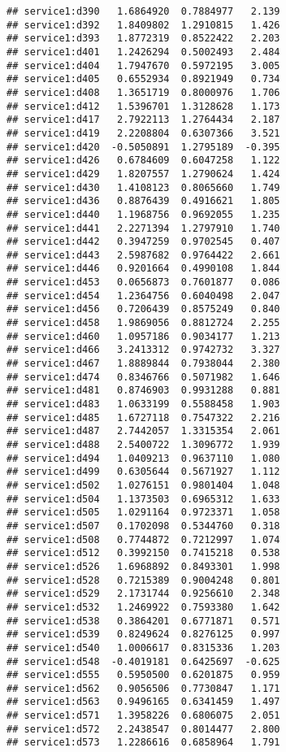 \documentclass[
]{article}
\begin{document}
\begin{verbatim}
## service1:d390   1.6864920  0.7884977   2.139
## service1:d392   1.8409802  1.2910815   1.426
## service1:d393   1.8772319  0.8522422   2.203
## service1:d401   1.2426294  0.5002493   2.484
## service1:d404   1.7947670  0.5972195   3.005
## service1:d405   0.6552934  0.8921949   0.734
## service1:d408   1.3651719  0.8000976   1.706
## service1:d412   1.5396701  1.3128628   1.173
## service1:d417   2.7922113  1.2764434   2.187
## service1:d419   2.2208804  0.6307366   3.521
## service1:d420  -0.5050891  1.2795189  -0.395
## service1:d426   0.6784609  0.6047258   1.122
## service1:d429   1.8207557  1.2790624   1.424
## service1:d430   1.4108123  0.8065660   1.749
## service1:d436   0.8876439  0.4916621   1.805
## service1:d440   1.1968756  0.9692055   1.235
## service1:d441   2.2271394  1.2797910   1.740
## service1:d442   0.3947259  0.9702545   0.407
## service1:d443   2.5987682  0.9764422   2.661
## service1:d446   0.9201664  0.4990108   1.844
## service1:d453   0.0656873  0.7601877   0.086
## service1:d454   1.2364756  0.6040498   2.047
## service1:d456   0.7206439  0.8575249   0.840
## service1:d458   1.9869056  0.8812724   2.255
## service1:d460   1.0957186  0.9034177   1.213
## service1:d466   3.2413312  0.9742732   3.327
## service1:d467   1.8889844  0.7938044   2.380
## service1:d474   0.8346766  0.5071982   1.646
## service1:d481   0.8746903  0.9931288   0.881
## service1:d483   1.0633199  0.5588458   1.903
## service1:d485   1.6727118  0.7547322   2.216
## service1:d487   2.7442057  1.3315354   2.061
## service1:d488   2.5400722  1.3096772   1.939
## service1:d494   1.0409213  0.9637110   1.080
## service1:d499   0.6305644  0.5671927   1.112
## service1:d502   1.0276151  0.9801404   1.048
## service1:d504   1.1373503  0.6965312   1.633
## service1:d505   1.0291164  0.9723371   1.058
## service1:d507   0.1702098  0.5344760   0.318
## service1:d508   0.7744872  0.7212997   1.074
## service1:d512   0.3992150  0.7415218   0.538
## service1:d526   1.6968892  0.8493301   1.998
## service1:d528   0.7215389  0.9004248   0.801
## service1:d529   2.1731744  0.9256610   2.348
## service1:d532   1.2469922  0.7593380   1.642
## service1:d538   0.3864201  0.6771871   0.571
## service1:d539   0.8249624  0.8276125   0.997
## service1:d540   1.0006617  0.8315336   1.203
## service1:d548  -0.4019181  0.6425697  -0.625
## service1:d555   0.5950500  0.6201875   0.959
## service1:d562   0.9056506  0.7730847   1.171
## service1:d563   0.9496165  0.6341459   1.497
## service1:d571   1.3958226  0.6806075   2.051
## service1:d572   2.2438547  0.8014477   2.800
## service1:d573   1.2286616  0.6858964   1.791

\end{verbatim}
\end{document}
